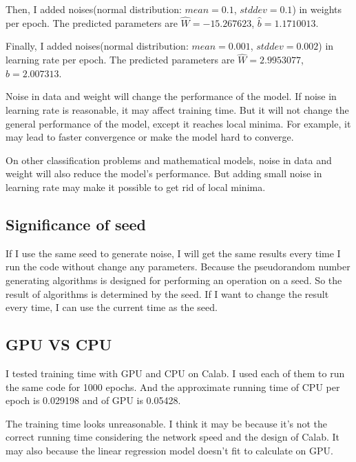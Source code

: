 \documentclass{article}
\begin{document}
Then, I added noises(normal distribution: $mean = 0.1$, $stddev=0.1$) in weights per epoch. The predicted parameters are $\hat{W} = -15.267623$, $\hat{b}=1.1710013$. 

Finally, I added noises(normal distribution: $mean = 0.001$, $stddev=0.002$) in learning rate per epoch. The predicted parameters are $\hat{W} = 2.9953077$, $\hat{b}=2.007313$. 

Noise in data and weight will change the performance of the model. If noise in learning rate is reasonable, it may affect training time. But it will not change the general performance of the model, except it reaches local minima. For example, it may lead to faster convergence or make the model hard to converge. 

On other classification problems and mathematical models, noise in data and weight will also reduce the model's performance. But adding small noise in learning rate may make it possible to get rid of local minima.  

\subsection{Significance of seed}
If I use the same seed to generate noise, I will get the same results every time I run the code without change any parameters. Because the pseudorandom number generating algorithms is designed for performing an operation on a seed. So the result of algorithms is determined by the seed. If I want to change the result every time, I can use the current time as the seed.


\subsection{GPU VS CPU}
I tested training time with GPU and CPU on Calab. I used each of them to run the same code for 1000 epochs. And the approximate running time of CPU per epoch is 0.029198 and of GPU is 0.05428. 

The training time looks unreasonable. I think it may be because it's not the correct running time considering the network speed and the design of Calab. It may also because the linear regression model doesn't fit to calculate on GPU.
\end{document}
